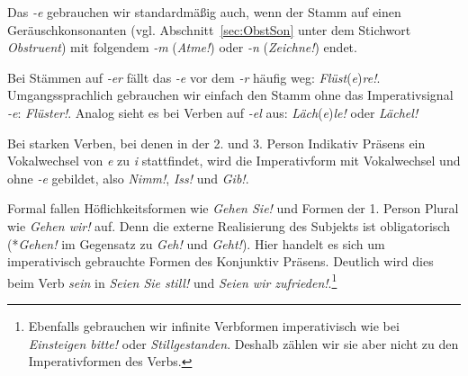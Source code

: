 Das \textit{-e} gebrauchen wir standardmäßig auch, wenn der Stamm auf einen Geräuschkonsonanten (vgl. Abschnitt~\ref{sec:ObstSon} unter dem Stichwort \textit{Obstruent}) mit folgendem \textit{-m} (\textit{Atme!}) oder \textit{-n} (\textit{Zeichne!}) endet. 

Bei Stämmen auf \textit{-er} fällt das \textit{-e} vor dem \textit{-r} häufig weg: \textit{Flüst}(\textit{e})\textit{re!}. Umgangssprachlich gebrauchen wir einfach den Stamm ohne das Imperativsignal \textit{-e}: \textit{Flüster!}. Analog sieht es bei Verben auf \textit{-el} aus: \textit{Läch}(\textit{e})\textit{le!} oder \textit{Lächel!}

Bei starken Verben, bei denen in der 2. und 3. Person Indikativ Präsens ein Vokalwechsel von \textit{e} zu \textit{i} stattfindet, wird die Imperativform mit Vokalwechsel und ohne \textit{-e} gebildet, also \zB \textit{Nimm!}, \textit{Iss!} und \textit{Gib!}. 

Formal fallen Höflichkeitsformen wie \textit{Gehen Sie!} und Formen der 1. Person Plural wie \textit{Gehen wir!} auf. Denn die externe Realisierung des Subjekts ist obligatorisch (*\textit{Gehen!} im Gegensatz zu \textit{Geh!} und \textit{Geht!}). Hier handelt es sich um imperativisch gebrauchte Formen des Konjunktiv Präsens. Deutlich wird dies beim Verb \textit{sein} in \textit{Seien Sie still!} und \textit{Seien wir zufrieden!}.\footnote{Ebenfalls gebrauchen wir infinite Verbformen imperativisch wie bei \textit{Einsteigen bitte!} oder \textit{Stillgestanden}. Deshalb zählen wir sie aber nicht zu den Imperativformen des Verbs.}



